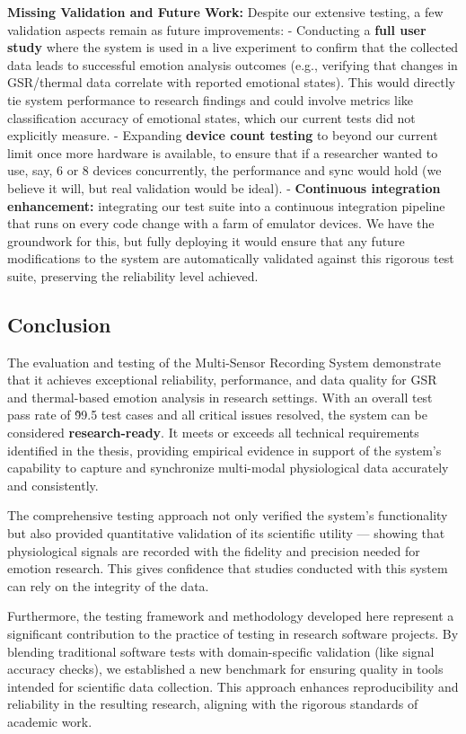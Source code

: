 \documentclass[11pt,a4paper]{report}
\begin{document}
{{\textbf{Missing Validation and Future Work:} Despite our extensive testing, a
few validation aspects remain as future improvements: - Conducting a
\textbf{full user study} where the system is used in a live experiment to
confirm that the collected data leads to successful emotion analysis
outcomes (e.g., verifying that changes in GSR/thermal data correlate
with reported emotional states). This would directly tie system
performance to research findings and could involve metrics like
classification accuracy of emotional states, which our current tests did
not explicitly measure. - Expanding \textbf{device count testing} to beyond
our current limit once more hardware is available, to ensure that if a
researcher wanted to use, say, 6 or 8 devices concurrently, the
performance and sync would hold (we believe it will, but real validation
would be ideal). - \textbf{Continuous integration enhancement:} integrating
our test suite into a continuous integration pipeline that runs on every
code change with a farm of emulator devices. We have the groundwork for
this, but fully deploying it would ensure that any future modifications
to the system are automatically validated against this rigorous test
suite, preserving the reliability level achieved.

\subsection{Conclusion}

The evaluation and testing of the Multi-Sensor Recording System
demonstrate that it achieves exceptional reliability, performance, and
data quality for GSR and thermal-based emotion analysis in research
settings. With an overall test pass rate of \~99.5%
test cases and all critical issues resolved, the system can be
considered \textbf{research-ready}. It meets or exceeds all technical
requirements identified in the thesis, providing empirical evidence in
support of the system's capability to capture and synchronize
multi-modal physiological data accurately and consistently.

The comprehensive testing approach not only verified the system's
functionality but also provided quantitative validation of its
scientific utility --- showing that physiological signals are recorded
with the fidelity and precision needed for emotion research. This gives
confidence that studies conducted with this system can rely on the
integrity of the data.

Furthermore, the testing framework and methodology developed here
represent a significant contribution to the practice of testing in
research software projects. By blending traditional software tests with
domain-specific validation (like signal accuracy checks), we established
a new benchmark for ensuring quality in tools intended for scientific
data collection. This approach enhances reproducibility and reliability
in the resulting research, aligning with the rigorous standards of
academic work.

}}
\end{document}
